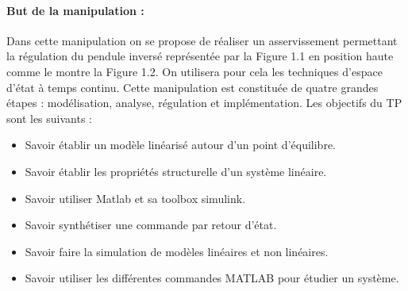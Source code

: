 \documentclass[12pt, a4paper, openany]{report}
\begin{document}




\paragraph{But de la manipulation :}  Dans cette manipulation on se propose de réaliser un asservissement permettant la régulation du pendule inversé représentée par la Figure 1.1 en position haute comme le montre la Figure 1.2. On utilisera pour cela les techniques d'espace d'état à temps continu. Cette manipulation est constituée de quatre grandes étapes : modélisation, analyse, régulation et implémentation. Les objectifs du TP sont les suivants :
\begin{itemize}
\item Savoir établir un modèle linéarisé autour d'un point d'équilibre.
\item Savoir établir les propriétés structurelle d'un système linéaire.
\item Savoir utiliser Matlab et sa toolbox simulink.
\item Savoir synthétiser une commande par retour d'état.
\item Savoir faire la simulation de modèles linéaires et non linéaires.
\item Savoir utiliser les différentes commandes MATLAB pour étudier un système.

\end{itemize}
\end{document}

